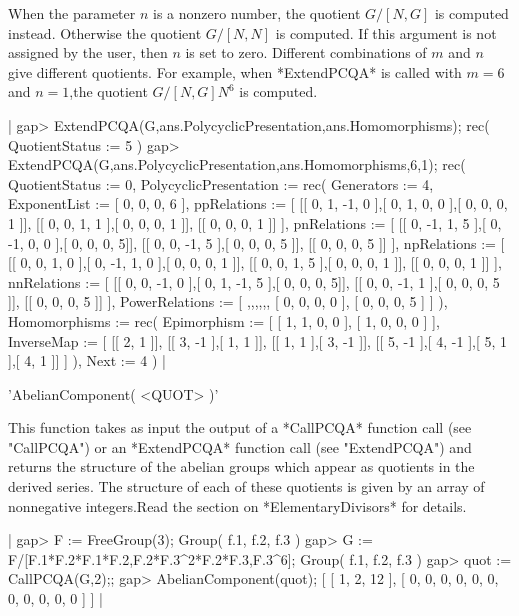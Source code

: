 When the parameter  $n$ is a nonzero number,  the quotient  $G/[N,G]$  is
computed instead.  Otherwise the quotient $G/[N,N]$ is computed.  If this
argument is not assigned by the user,  then $n$ is set to zero. Different
combinations of  $m$ and  $n$ give different quotients. For example, when
*ExtendPCQA* is called with $m = 6$ and $n = 1$,the quotient $G/[N,G]N^6$
is computed.

|
    gap> ExtendPCQA(G,ans.PolycyclicPresentation,ans.Homomorphisms);
    rec(
       QuotientStatus := 5 )
    gap> ExtendPCQA(G,ans.PolycyclicPresentation,ans.Homomorphisms,6,1);
    rec(
      QuotientStatus := 0,
      PolycyclicPresentation := rec(
        Generators := 4,
        ExponentList := [ 0, 0, 0, 6 ],
        ppRelations := [ [[ 0, 1, -1, 0 ],[ 0, 1, 0, 0 ],[ 0, 0, 0, 1 ]],
                         [[ 0, 0, 1, 1 ],[ 0, 0, 0, 1 ]],
                         [[ 0, 0, 0, 1 ]] ],
        pnRelations := [ [[ 0, -1, 1, 5 ],[ 0, -1, 0, 0 ],[ 0, 0, 0, 5]],
                         [[ 0, 0, -1, 5 ],[ 0, 0, 0, 5 ]],
                         [[ 0, 0, 0, 5 ]] ],
        npRelations := [ [[ 0, 0, 1, 0 ],[ 0, -1, 1, 0 ],[ 0, 0, 0, 1 ]],
                         [[ 0, 0, 1, 5 ],[ 0, 0, 0, 1 ]],
                         [[ 0, 0, 0, 1 ]] ],
        nnRelations := [ [[ 0, 0, -1, 0 ],[ 0, 1, -1, 5 ],[ 0, 0, 0, 5]],
                         [[ 0, 0, -1, 1 ],[ 0, 0, 0, 5 ]],
                         [[ 0, 0, 0, 5 ]] ],
        PowerRelations := [ ,,,,,, [ 0, 0, 0, 0 ], [ 0, 0, 0, 5 ] ] ),
      Homomorphisms := rec(
        Epimorphism := [ [ 1, 1, 0, 0 ], [ 1, 0, 0, 0 ] ],
        InverseMap :=
          [ [[ 2, 1 ]], [[ 3, -1 ],[ 1, 1 ]], [[ 1, 1 ],[ 3, -1 ]],
            [[ 5, -1 ],[ 4, -1 ],[ 5, 1 ],[ 4, 1 ]] ] ),
      Next := 4 )
|



'AbelianComponent( <QUOT> )'

This function  takes  as input the output of a  *CallPCQA*  function call
(see "CallPCQA") or an  *ExtendPCQA* function call (see "ExtendPCQA") and
returns the structure of the abelian groups  which appear as quotients in
the derived series.  The structure of each of these quotients is given by
an array of nonnegative integers.Read the section on *ElementaryDivisors*
for details.

|
    gap> F := FreeGroup(3);
    Group( f.1, f.2, f.3 )
    gap> G := F/[F.1*F.2*F.1*F.2,F.2*F.3^2*F.2*F.3,F.3^6];
    Group( f.1, f.2, f.3 )
    gap> quot := CallPCQA(G,2);;
    gap> AbelianComponent(quot);
    [ [ 1, 2, 12 ], [ 0, 0, 0, 0, 0, 0, 0, 0, 0, 0, 0 ] ]
|

